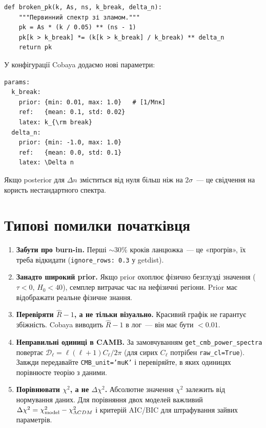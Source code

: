 \begin{verbatim}
def broken_pk(k, As, ns, k_break, delta_n):
    """Первинний спектр зі зламом."""
    pk = As * (k / 0.05) ** (ns - 1)
    pk[k > k_break] *= (k[k > k_break] / k_break) ** delta_n
    return pk
\end{verbatim}

У конфігурації Cobaya додаємо нові параметри:
\begin{verbatim}
params:
  k_break:
    prior: {min: 0.01, max: 1.0}   # [1/Мпк]
    ref:   {mean: 0.1, std: 0.02}
    latex: k_{\rm break}
  delta_n:
    prior: {min: -1.0, max: 1.0}
    ref:   {mean: 0.0, std: 0.1}
    latex: \Delta n
\end{verbatim}

Якщо posterior для $\Delta n$ зміститься від нуля більш ніж
на $2\sigma$~--- це свідчення на користь нестандартного спектра.

\section{Типові помилки початківця}

\begin{enumerate}
  \item \textbf{Забути про burn-in.} Перші $\sim 30\%$ кроків
        ланцюжка~--- це «прогрів», їх треба відкидати
        (\texttt{ignore\_rows: 0.3} у getdist).

  \item \textbf{Занадто широкий prior.} Якщо prior охоплює
        фізично безглузді значення ($\tau < 0$, $H_0 < 40$),
        семплер витрачає час на нефізичні регіони. Prior має
        відображати реальне фізичне знання.

  \item \textbf{Перевіряти $\hat{R}-1$, а не тільки візуально.}
        Красивий графік не гарантує збіжність. Cobaya виводить
        $\hat{R}-1$ в лог~--- він має бути $< 0.01$.

  \item \textbf{Неправильні одиниці в CAMB.} За замовчуванням
        \texttt{get\_cmb\_power\_spectra} повертає $\mathcal{D}_\ell=\ell(\ell+1)C_\ell/2\pi$
        (для сирих $C_\ell$ потрібен \texttt{raw\_cl=True}). Завжди
        передавайте \texttt{CMB\_unit='muK'} і перевіряйте,
        в яких одиницях порівнюєте теорію з даними.

  \item \textbf{Порівнювати $\chi^2$, а не $\Delta\chi^2$.}
        Абсолютне значення $\chi^2$ залежить від нормування
        даних. Для порівняння двох моделей важливий
        $\Delta\chi^2 = \chi^2_{\rm model} - \chi^2_{\Lambda CDM}$
        і критерій AIC/BIC для штрафування зайвих параметрів.
\end{enumerate}

